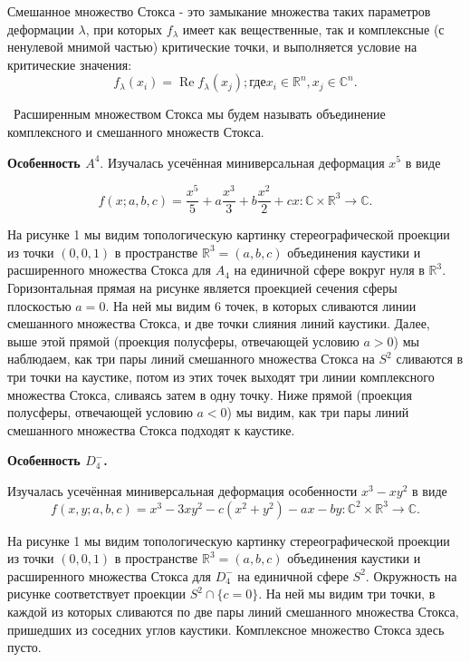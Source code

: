 \begin{definition}
	Смешанное множество Стокса - это замыкание множества таких параметров деформации $\lambda$,
	при которых $f_\lambda$ имеет как вещественные, так и комплексные (с ненулевой мнимой частью) критические точки,
	и выполняется условие на критические значения: $$f_\lambda(x_i)=\mathop{\text{Re}}f_\lambda(x_j); \text{где} x_i\in\mathbb{R}^n, x_j\in\mathbb{C}^n.$$
\end{definition}

\begin{definition}\
	Расширенным множеством Стокса мы будем называть объединение комплексного и смешанного множеств Стокса.
\end{definition}


\textbf{Особенность $A^4.$} Изучалась усечённая миниверсальная деформация $x^5$ в виде

$$
	f(x;a,b,c)=\dfrac{x^5}{5}+a\dfrac{x^3}{3}+b\dfrac{x^2}{2}+cx:\mathbb{C}\times\mathbb{R}^3\rightarrow\mathbb{C}.
$$

На рисунке 1 мы видим топологическую картинку стереографической проекции из точки $(0,0,1)$ в пространстве $\mathbb{R}^3=(a,b,c)$ объединения каустики и расширенного множества Стокса для $A_4$ на единичной сфере вокруг нуля в $\mathbb{R}^3.$ Горизонтальная прямая на рисунке является проекцией сечения сферы плоскостью $a=0.$ На ней мы видим 6 точек, в которых сливаются линии смешанного множества Стокса, и две точки слияния линий каустики. Далее, выше этой прямой (проекция полусферы, отвечающей условию $a>0$) мы наблюдаем, как три пары линий смешанного множества Стокса на $S^2$ сливаются в три точки на каустике, потом из этих точек выходят три линии комплексного множества Стокса, сливаясь затем в одну точку. Ниже прямой (проекция полусферы, отвечающей условию $a<0$) мы видим, как три пары линий смешанного множества Стокса подходят к каустике.

\textbf{Особенность $D_{4}^-$.}

Изучалась усечённая миниверсальная деформация особенности $x^3-xy^2$ в виде $$f(x,y;a,b,c)=x^3-3xy^2-c(x^2+y^2)-ax-by:\mathbb{C}^2\times\mathbb{R}^3\rightarrow\mathbb{C}.$$

 На рисунке 1 мы видим топологическую картинку стереографической проекции из точки $(0,0,1)$ в пространстве $\mathbb{R}^3=(a,b,c)$ объединения каустики и расширенного множества Стокса для $D_4^-$ на единичной сфере $S^2.$ Окружность на рисунке соответствует проекции $S^2\cap\{c=0\}.$ На ней мы видим три точки, в каждой из которых сливаются по две пары линий смешанного множества Стокса, пришедших из соседних углов каустики. Комплексное множество Стокса здесь пусто.

